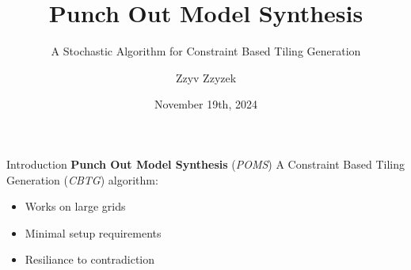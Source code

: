 \documentclass{beamer}
\title{Punch Out Model Synthesis}
\subtitle{A Stochastic Algorithm for Constraint Based Tiling Generation}
\date{November 19th, 2024}
\author{Zzyv Zzyzek}
\begin{document}
\newcommand{\specialcell}[2][c]{\begin{tabular}[#1]{@{}l@{}}#2\end{tabular}}
\newcommand{\specialcellCenter}[2][c]{\begin{tabular}[#1]{@{}c@{}}#2\end{tabular}}

  \maketitle



  \begin{frame}[fragile]{Introduction}
    \textbf{Punch Out Model Synthesis} (\textit{POMS})
    A Constraint Based Tiling Generation (\textit{CBTG}) algorithm:
    \begin{itemize}
      \item Works on large grids
      \item Minimal setup requirements
      \item Resiliance to contradiction
    \end{itemize}
  \end{frame}
\end{document}
